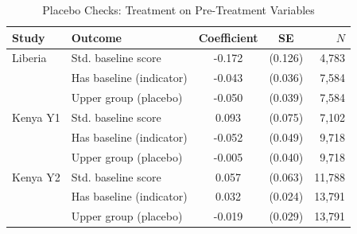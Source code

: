 \begin{table}[htbp]
\centering\small
\caption{Placebo Checks: Treatment on Pre-Treatment Variables}
\label{tab:placebo}
\begin{tabular}{llccr}
\toprule
Study & Outcome & Coefficient & SE & $N$ \\
\midrule
Liberia & Std. baseline score & -0.172 & (0.126) & 4,783 \\
 & Has baseline (indicator) & -0.043 & (0.036) & 7,584 \\
 & Upper group (placebo) & -0.050 & (0.039) & 7,584 \\
\addlinespace
Kenya Y1 & Std. baseline score & 0.093 & (0.075) & 7,102 \\
 & Has baseline (indicator) & -0.052 & (0.049) & 9,718 \\
 & Upper group (placebo) & -0.005 & (0.040) & 9,718 \\
\addlinespace
Kenya Y2 & Std. baseline score & 0.057 & (0.063) & 11,788 \\
 & Has baseline (indicator) & 0.032 & (0.024) & 13,791 \\
 & Upper group (placebo) & -0.019 & (0.029) & 13,791 \\
\bottomrule
\end{tabular}
\par\smallskip{}
\end{table}